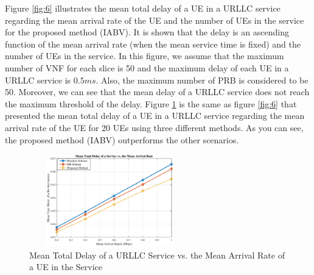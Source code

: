 \documentclass[lettersize,journal]{IEEEtran}
\begin{document}
Figure \ref{fig:6} illustrates the mean total delay of a UE in a URLLC service regarding the mean arrival rate of the UE and the number of UEs in the service for the proposed method (IABV).
It is shown that the delay is an ascending function of the mean arrival rate (when the mean service time is fixed) and the number of UEs in the service. In this figure, we assume that the maximum number of VNF for each slice is 50 and the maximum delay of each UE in a URLLC service is $0.5ms$. Also, the maximum number of PRB is considered to be 50.
 Moreover, we can see that the mean delay of a URLLC service
does not reach the maximum threshold of the delay.
Figure \ref{fig:7} is the same as figure \ref{fig:6} that presented the mean total delay of a UE in a URLLC service regarding the mean arrival rate of the UE for 20 UEs using three different methods. As you can see, the proposed method (IABV) outperforms the other scenarios.
\begin{figure}%
  \centering
  \captionsetup{justification=centering}
    \includegraphics[width=7cm,height=4cm]{delay1_new.eps}
    \caption{Mean Total Delay of a URLLC Service vs. the Mean Arrival Rate of a UE in the Service}
  \label{fig:7}
\end{figure}
\end{document}
